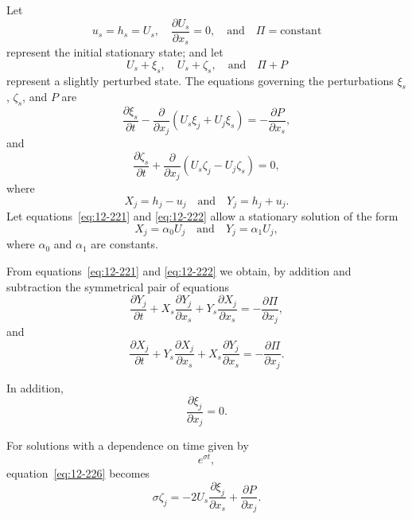 Let
\begin{equation}
\label{eq:12-219}
u_s = h_s = U_s, \quad \frac{\partial U_s}{\partial x_s} = 0, \quad \text{and} \quad \Pi = \text{constant}
\end{equation}
represent the initial stationary state; and let
\begin{equation}
\label{eq:12-220}
U_s + \xi_s, \quad U_s + \zeta_s, \quad \text{and} \quad \Pi + P
\end{equation}
represent a slightly perturbed state. The equations governing the perturbations $\xi_s$, $\zeta_s$, and $P$ are
\begin{equation}
\label{eq:12-221}
\frac{\partial \xi_s}{\partial t} - \frac{\partial}{\partial x_j}(U_s\xi_j + U_j\xi_s) = -\frac{\partial P}{\partial x_s},
\end{equation}
and
\begin{equation}
\label{eq:12-222}
\frac{\partial \zeta_s}{\partial t} + \frac{\partial}{\partial x_j}(U_s\zeta_j - U_j\zeta_s) = 0,
\end{equation}
where
\begin{equation}
\label{eq:12-223}
X_j = h_j - u_j \quad \text{and} \quad Y_j = h_j + u_j.
\end{equation}
Let equations~\eqref{eq:12-221} and \eqref{eq:12-222} allow a stationary solution of the form
\begin{equation}
\label{eq:12-224}
X_j = \alpha_0 U_j \quad \text{and} \quad Y_j = \alpha_1 U_j,
\end{equation}
where $\alpha_0$ and $\alpha_1$ are constants.

From equations~\eqref{eq:12-221} and \eqref{eq:12-222} we obtain, by addition and subtraction the symmetrical pair of equations
\begin{equation}
\label{eq:12-225}
\frac{\partial Y_j}{\partial t} + X_s\frac{\partial Y_j}{\partial x_s} + Y_s\frac{\partial X_j}{\partial x_s} = -\frac{\partial\Pi}{\partial x_j},
\end{equation}
and
\begin{equation}
\label{eq:12-226}
\frac{\partial X_j}{\partial t} + Y_s\frac{\partial X_j}{\partial x_s} + X_s\frac{\partial Y_j}{\partial x_s} = -\frac{\partial\Pi}{\partial x_j}.
\end{equation}

In addition,
\begin{equation}
\label{eq:12-227}
\frac{\partial \xi_j}{\partial x_j} = 0.
\end{equation}

For solutions with a dependence on time given by
\begin{equation}
\label{eq:12-228}
e^{\sigma t},
\end{equation}
equation~\eqref{eq:12-226} becomes
\begin{equation}
\label{eq:12-229}
\sigma \zeta_j = -2U_s\frac{\partial \xi_j}{\partial x_s} + \frac{\partial P}{\partial x_j}.
\end{equation}

